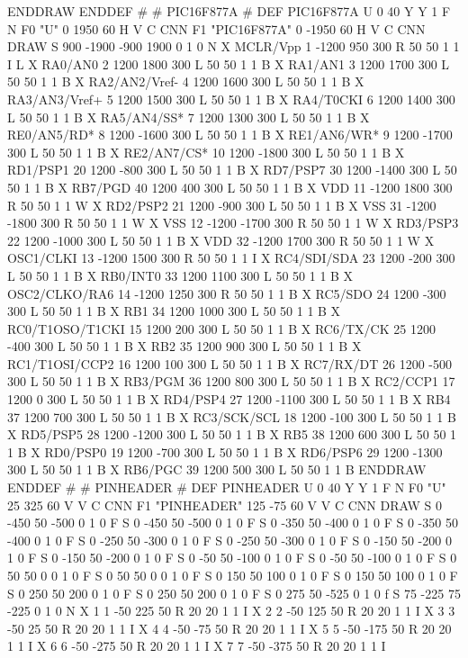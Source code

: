 ENDDRAW
ENDDEF
#
# PIC16F877A
#
DEF PIC16F877A U 0 40 Y Y 1 F N
F0 "U" 0 1950 60 H V C CNN
F1 "PIC16F877A" 0 -1950 60 H V C CNN
DRAW
S 900 -1900 -900 1900 0 1 0 N
X MCLR/Vpp 1 -1200 950 300 R 50 50 1 1 I L
X RA0/AN0 2 1200 1800 300 L 50 50 1 1 B
X RA1/AN1 3 1200 1700 300 L 50 50 1 1 B
X RA2/AN2/Vref- 4 1200 1600 300 L 50 50 1 1 B
X RA3/AN3/Vref+ 5 1200 1500 300 L 50 50 1 1 B
X RA4/T0CKI 6 1200 1400 300 L 50 50 1 1 B
X RA5/AN4/SS* 7 1200 1300 300 L 50 50 1 1 B
X RE0/AN5/RD* 8 1200 -1600 300 L 50 50 1 1 B
X RE1/AN6/WR* 9 1200 -1700 300 L 50 50 1 1 B
X RE2/AN7/CS* 10 1200 -1800 300 L 50 50 1 1 B
X RD1/PSP1 20 1200 -800 300 L 50 50 1 1 B
X RD7/PSP7 30 1200 -1400 300 L 50 50 1 1 B
X RB7/PGD 40 1200 400 300 L 50 50 1 1 B
X VDD 11 -1200 1800 300 R 50 50 1 1 W
X RD2/PSP2 21 1200 -900 300 L 50 50 1 1 B
X VSS 31 -1200 -1800 300 R 50 50 1 1 W
X VSS 12 -1200 -1700 300 R 50 50 1 1 W
X RD3/PSP3 22 1200 -1000 300 L 50 50 1 1 B
X VDD 32 -1200 1700 300 R 50 50 1 1 W
X OSC1/CLKI 13 -1200 1500 300 R 50 50 1 1 I
X RC4/SDI/SDA 23 1200 -200 300 L 50 50 1 1 B
X RB0/INT0 33 1200 1100 300 L 50 50 1 1 B
X OSC2/CLKO/RA6 14 -1200 1250 300 R 50 50 1 1 B
X RC5/SDO 24 1200 -300 300 L 50 50 1 1 B
X RB1 34 1200 1000 300 L 50 50 1 1 B
X RC0/T1OSO/T1CKI 15 1200 200 300 L 50 50 1 1 B
X RC6/TX/CK 25 1200 -400 300 L 50 50 1 1 B
X RB2 35 1200 900 300 L 50 50 1 1 B
X RC1/T1OSI/CCP2 16 1200 100 300 L 50 50 1 1 B
X RC7/RX/DT 26 1200 -500 300 L 50 50 1 1 B
X RB3/PGM 36 1200 800 300 L 50 50 1 1 B
X RC2/CCP1 17 1200 0 300 L 50 50 1 1 B
X RD4/PSP4 27 1200 -1100 300 L 50 50 1 1 B
X RB4 37 1200 700 300 L 50 50 1 1 B
X RC3/SCK/SCL 18 1200 -100 300 L 50 50 1 1 B
X RD5/PSP5 28 1200 -1200 300 L 50 50 1 1 B
X RB5 38 1200 600 300 L 50 50 1 1 B
X RD0/PSP0 19 1200 -700 300 L 50 50 1 1 B
X RD6/PSP6 29 1200 -1300 300 L 50 50 1 1 B
X RB6/PGC 39 1200 500 300 L 50 50 1 1 B
ENDDRAW
ENDDEF
#
# PINHEADER
#
DEF PINHEADER U 0 40 Y Y 1 F N
F0 "U" 25 325 60 V V C CNN
F1 "PINHEADER" 125 -75 60 V V C CNN
DRAW
S 0 -450 50 -500 0 1 0 F
S 0 -450 50 -500 0 1 0 F
S 0 -350 50 -400 0 1 0 F
S 0 -350 50 -400 0 1 0 F
S 0 -250 50 -300 0 1 0 F
S 0 -250 50 -300 0 1 0 F
S 0 -150 50 -200 0 1 0 F
S 0 -150 50 -200 0 1 0 F
S 0 -50 50 -100 0 1 0 F
S 0 -50 50 -100 0 1 0 F
S 0 50 50 0 0 1 0 F
S 0 50 50 0 0 1 0 F
S 0 150 50 100 0 1 0 F
S 0 150 50 100 0 1 0 F
S 0 250 50 200 0 1 0 F
S 0 250 50 200 0 1 0 F
S 0 275 50 -525 0 1 0 f
S 75 -225 75 -225 0 1 0 N
X 1 1 -50 225 50 R 20 20 1 1 I
X 2 2 -50 125 50 R 20 20 1 1 I
X 3 3 -50 25 50 R 20 20 1 1 I
X 4 4 -50 -75 50 R 20 20 1 1 I
X 5 5 -50 -175 50 R 20 20 1 1 I
X 6 6 -50 -275 50 R 20 20 1 1 I
X 7 7 -50 -375 50 R 20 20 1 1 I
